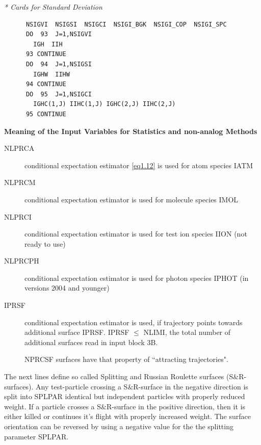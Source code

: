 \textsl{* Cards for Standard Deviation} 

\begin{lstlisting}
      NSIGVI  NSIGSI  NSIGCI  NSIGI_BGK  NSIGI_COP  NSIGI_SPC
      DO  93  J=1,NSIGVI
        IGH  IIH
      93 CONTINUE
      DO  94  J=1,NSIGSI
        IGHW  IIHW
      94 CONTINUE
      DO  95  J=1,NSIGCI
        IGHC(1,J) IIHC(1,J) IGHC(2,J) IIHC(2,J)
      95 CONTINUE
\end{lstlisting} 

\medskip 

\textbf{Meaning of the Input Variables for Statistics and non-analog Methods} 

\medskip 

\begin{description}
  \item[NLPRCA] conditional expectation estimator \cref{eq1.12} is used for atom species IATM
  \item[NLPRCM] conditional expectation estimator is used for molecule species IMOL
  \item[NLPRCI] conditional expectation estimator is used for test ion species IION (not ready to use)
  \item[NLPRCPH] conditional expectation estimator is used for photon species IPHOT (in versions 2004 and younger)
  \item[IPRSF] conditional expectation estimator is used, if trajectory points towards additional surface IPRSF.
        IPRSF $\leq$ NLIMI, the total number of additional surfaces read in input block 3B.

        NPRCSF surfaces have that property of ``attracting trajectories".
\end{description}
The next lines define so called Splitting and Russian Roulette surfaces (S$\&$R-surfaces).
Any test-particle crossing a S$\&$R-surface in the negative direction is split into SPLPAR identical but independent particles with properly reduced weight.
If a particle crosses a S$\&$R-surface in the positive direction, then it is either killed or continues it's flight with properly increased weight.
The surface orientation can be reversed by using a negative value for the the splitting parameter SPLPAR.

